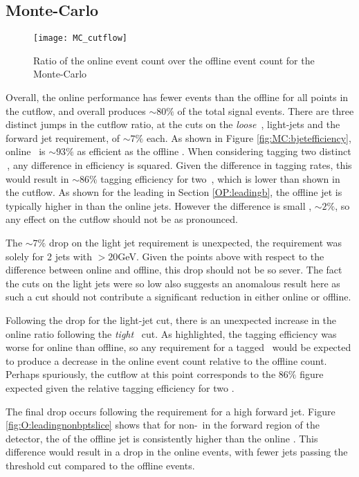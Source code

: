     \subsection{Monte-Carlo}
        \begin{figure}[h]
            \centering
            \texttt{[image: MC\_cutflow]}
            \caption[\VBFHBB\ Cutflow ratio for Monte-Carlo simulation]{Ratio of the online event count over the offline event count for the Monte-Carlo}
            \label{f:cutflowMC}
        \end{figure}

    Overall, the online performance has fewer events than the offline for all points in the cutflow, and overall produces $\sim80\%$ of the total signal events. There are three distinct jumps in the cutflow ratio, at the cuts on the \textit{loose} \bjets\,, light-jets and the forward jet requirement, of $\sim7\%$ each. As shown in Figure \ref{fig:MC:bjetefficiency}, online \btag\, is $\sim93\%$ as efficient as the offline \btag. When considering tagging two distinct \bjets\,, any difference in efficiency is squared. Given the difference in tagging rates, this would result in $\sim86\%$ tagging efficiency for two \bjets\,, which is lower than shown in the cutflow. As shown for the leading \bjet in Section \ref{OP:leadingb}, the offline jet is typically higher in \pt than the online jets. However the difference is small , $\sim2\%$, so any effect on the cutflow should not be as pronounced.

    The $\sim7\%$ drop on the light jet requirement is unexpected, the requirement was solely for 2 jets with \pt$>20$GeV. Given the points above with respect to the \pt difference between online and offline, this drop should not be so sever. The fact the \pt cuts on the light jets were so low also suggests an anomalous result here as such a cut should not contribute a significant reduction in either online or offline.

    Following the drop for the light-jet cut, there is an unexpected increase in the online ratio following the \textit{tight} \btagging\, cut. As highlighted, the tagging efficiency was worse for online than offline, so any requirement for a tagged \bjet\, would be expected to produce a decrease in the online event count relative to the offline count. Perhaps spuriously, the cutflow at this point corresponds to the $86\%$ figure expected given the relative tagging efficiency for two \bjets.

    The final drop occurs following the requirement for a high \pt forward jet. Figure \ref{fig:O:leadingnonbptslice} shows that for non-\bjets\, in the forward region of the detector, the \pt of the offline jet is consistently higher than the online \pt. This difference would result in a drop in the online events, with fewer jets passing the threshold \pt cut compared to the offline events.

